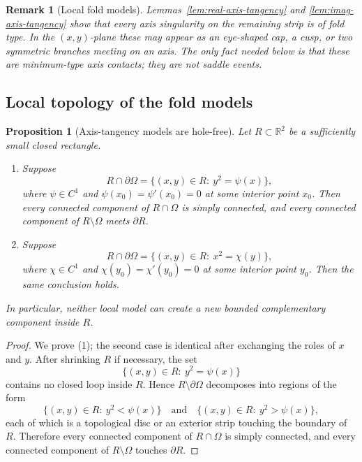 \documentclass[11pt]{article}
\newtheorem{proposition}[theorem]{Proposition}
\newtheorem{remark}[theorem]{Remark}
\newcommand{\R}{\mathbb{R}}
\begin{document}
\begin{remark}[Local fold models]\label{rem:fold}
Lemmas~\ref{lem:real-axis-tangency} and \ref{lem:imag-axis-tangency} show that every axis singularity on the remaining strip is of fold type. In the \((x,y)\)-plane these may appear as an eye-shaped cap, a cusp, or two symmetric branches meeting on an axis. The only fact needed below is that these are \emph{minimum-type} axis contacts; they are not saddle events.
\end{remark}

\subsection*{Local topology of the fold models}

\begin{proposition}[Axis-tangency models are hole-free]\label{prop:axis-hole-free}
Let \(R\subset\R^2\) be a sufficiently small closed rectangle.

\begin{enumerate}
\item Suppose
\[
R\cap \partial\Omega
=
\{(x,y)\in R:\ y^2=\psi(x)\},
\]
where \(\psi\in C^1\) and \(\psi(x_0)=\psi'(x_0)=0\) at some interior point \(x_0\). Then every connected component of \(R\cap\Omega\) is simply connected, and every connected component of \(R\setminus\Omega\) meets \(\partial R\).

\item Suppose
\[
R\cap \partial\Omega
=
\{(x,y)\in R:\ x^2=\chi(y)\},
\]
where \(\chi\in C^1\) and \(\chi(y_0)=\chi'(y_0)=0\) at some interior point \(y_0\). Then the same conclusion holds.
\end{enumerate}

In particular, neither local model can create a new bounded complementary component inside \(R\).
\end{proposition}

\begin{proof}
We prove (1); the second case is identical after exchanging the roles of \(x\) and \(y\). After shrinking \(R\) if necessary, the set
\[
\{(x,y)\in R:\ y^2=\psi(x)\}
\]
contains no closed loop inside \(R\). Hence \(R\setminus \partial\Omega\) decomposes into regions of the form
\[
\{(x,y)\in R:\ y^2<\psi(x)\}
\quad\text{and}\quad
\{(x,y)\in R:\ y^2>\psi(x)\},
\]
each of which is a topological disc or an exterior strip touching the boundary of \(R\). Therefore every connected component of \(R\cap \Omega\) is simply connected, and every connected component of \(R\setminus\Omega\) touches \(\partial R\).
\end{proof}
\end{document}

